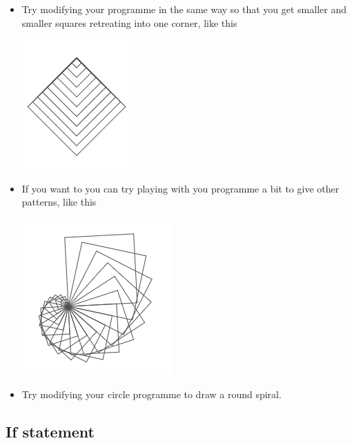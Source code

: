 \documentclass[11pt,a4paper]{scrartcl}
\begin{document}
\begin{itemize}
\item Try modifying your programme in the same way so that you get smaller and smaller squares retreating into one corner, like this
\begin{center}
\includegraphics{repeat_squares_pic.png}
\end{center}
\item If you want to you can try playing with you programme a bit to give other patterns, like this
\begin{center}
\includegraphics{squares_spiral_pic.png}
\end{center}
\item Try modifying your circle programme to draw a round spiral.
\end{itemize}

\subsection*{If statement}
\end{document}
